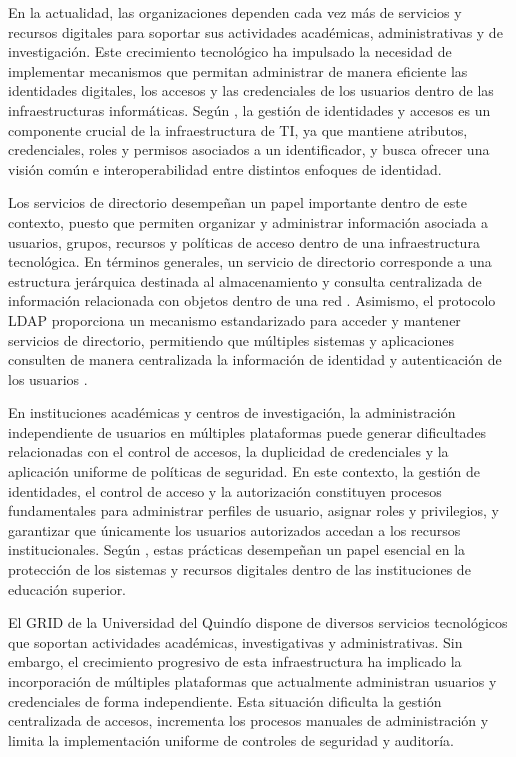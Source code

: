\label{cap:introduccion}
\vspace*{0.7cm}


En la actualidad, las organizaciones dependen cada vez más de servicios y recursos digitales para soportar sus actividades académicas, administrativas y de investigación. Este crecimiento tecnológico ha impulsado la necesidad de implementar mecanismos que permitan administrar de manera eficiente las identidades digitales, los accesos y las credenciales de los usuarios dentro de las infraestructuras informáticas. Según \citet{Pohn2022}, la gestión de identidades y accesos es un componente crucial de la infraestructura de \ac{TI}, ya que mantiene atributos, credenciales, roles y permisos asociados a un identificador, y busca ofrecer una visión común e interoperabilidad entre distintos enfoques de identidad.

Los servicios de directorio desempeñan un papel importante dentro de este contexto, puesto que permiten organizar y administrar información asociada a usuarios, grupos, recursos y políticas de acceso dentro de una infraestructura tecnológica. En términos generales, un servicio de directorio corresponde a una estructura jerárquica destinada al almacenamiento y consulta centralizada de información relacionada con objetos dentro de una red \citep{Microsoft2025}. Asimismo, el protocolo \ac{LDAP} proporciona un mecanismo estandarizado para acceder y mantener servicios de directorio, permitiendo que múltiples sistemas y aplicaciones consulten de manera centralizada la información de identidad y autenticación de los usuarios \citep{Pohn2022}.

En instituciones académicas y centros de investigación, la administración independiente de usuarios en múltiples plataformas puede generar dificultades relacionadas con el control de accesos, la duplicidad de credenciales y la aplicación uniforme de políticas de seguridad. En este contexto, la gestión de identidades, el control de acceso y la autorización constituyen procesos fundamentales para administrar perfiles de usuario, asignar roles y privilegios, y garantizar que únicamente los usuarios autorizados accedan a los recursos institucionales. Según \citet{Mollakuqe2024}, estas prácticas desempeñan un papel esencial en la protección de los sistemas y recursos digitales dentro de las instituciones de educación superior.

El \ac{GRID} de la Universidad del Quindío dispone de diversos servicios tecnológicos que soportan actividades académicas, investigativas y administrativas. Sin embargo, el crecimiento progresivo de esta infraestructura ha implicado la incorporación de múltiples plataformas que actualmente administran usuarios y credenciales de forma independiente. Esta situación dificulta la gestión centralizada de accesos, incrementa los procesos manuales de administración y limita la implementación uniforme de controles de seguridad y auditoría.

